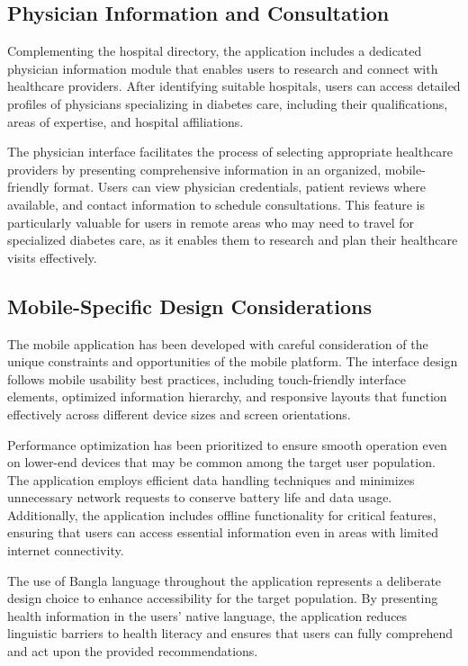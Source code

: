 \subsection{Physician Information and Consultation}

Complementing the hospital directory, the application includes a dedicated physician information module that enables users to research and connect with healthcare providers. After identifying suitable hospitals, users can access detailed profiles of physicians specializing in diabetes care, including their qualifications, areas of expertise, and hospital affiliations.

The physician interface facilitates the process of selecting appropriate healthcare providers by presenting comprehensive information in an organized, mobile-friendly format. Users can view physician credentials, patient reviews where available, and contact information to schedule consultations. This feature is particularly valuable for users in remote areas who may need to travel for specialized diabetes care, as it enables them to research and plan their healthcare visits effectively.

\subsection{Mobile-Specific Design Considerations}

The mobile application has been developed with careful consideration of the unique constraints and opportunities of the mobile platform. The interface design follows mobile usability best practices, including touch-friendly interface elements, optimized information hierarchy, and responsive layouts that function effectively across different device sizes and screen orientations.

Performance optimization has been prioritized to ensure smooth operation even on lower-end devices that may be common among the target user population. The application employs efficient data handling techniques and minimizes unnecessary network requests to conserve battery life and data usage. Additionally, the application includes offline functionality for critical features, ensuring that users can access essential information even in areas with limited internet connectivity.

The use of Bangla language throughout the application represents a deliberate design choice to enhance accessibility for the target population. By presenting health information in the users' native language, the application reduces linguistic barriers to health literacy and ensures that users can fully comprehend and act upon the provided recommendations.